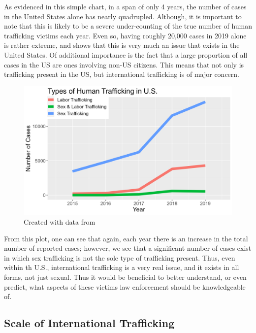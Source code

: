 \documentclass{article} %
\begin{document}
\FloatBarrier

As evidenced in this simple chart, in a span of only 4 years, the number of cases in the United States alone has nearly quadrupled. Although, it is important to note that this is likely to be a severe under-counting of the true number of human trafficking victims each year. Even so, having roughly 20,000 cases in 2019 alone is rather extreme, and shows that this is very much an issue that exists in the United States. Of additional importance is the fact that a large proportion of all cases in the US are ones involving non-US citizens. This means that not only is trafficking present in the US, but international trafficking is of major concern.

\FloatBarrier

\begin{figure}[H]
	\includegraphics[width = \textwidth]{USTrafficking2}
	\scriptsize{\caption{Created with data from \cite{CTDC}}}
\end{figure}

\FloatBarrier

From this plot, one can see that again, each year there is an increase in the total number of reported cases; however, we see that a significant number of cases exist in which sex trafficking is not the sole type of trafficking present. Thus, even within th U.S., international trafficking is a very real issue, and it exists in all forms, not just sexual. Thus it would be beneficial to better understand, or even predict, what aspects of these victims law enforcement should be knowledgeable of. 

\subsection*{Scale of International Trafficking}
\end{document}

